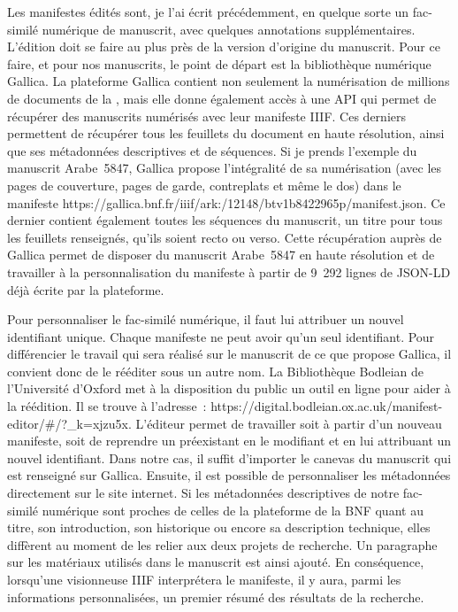 Les manifestes édités sont, je l’ai écrit précédemment, en quelque sorte un fac-similé numérique de manuscrit, avec quelques annotations supplémentaires. L’édition doit se faire au plus près de la version d’origine du manuscrit. Pour ce faire, et pour nos manuscrits, le point de départ est la bibliothèque numérique Gallica. La plateforme Gallica contient non seulement la numérisation de millions de documents de la , mais elle donne également accès à une API qui permet de récupérer des manuscrits numérisés avec leur manifeste IIIF. Ces derniers permettent de récupérer tous les feuillets du document en haute résolution, ainsi que ses métadonnées descriptives et de séquences. Si je prends l’exemple du manuscrit Arabe~5847, Gallica propose l’intégralité de sa numérisation (avec les pages de couverture, pages de garde, contreplats et même le dos) dans le manifeste https://gallica.bnf.fr/iiif/ark:/12148/btv1b8422965p/manifest.json. Ce dernier contient également toutes les séquences du manuscrit, un titre pour tous les feuillets renseignés, qu’ils soient recto ou verso. Cette récupération auprès de Gallica permet de disposer du manuscrit Arabe~5847 en haute résolution et de travailler à la personnalisation du manifeste à partir de 9~292 lignes de JSON-LD déjà écrite par la plateforme.\par
Pour personnaliser le fac-similé numérique, il faut lui attribuer un nouvel identifiant unique. Chaque manifeste ne peut avoir qu’un seul identifiant. Pour différencier le travail qui sera réalisé sur le manuscrit de ce que propose Gallica, il convient donc de le rééditer sous un autre nom. La Bibliothèque Bodleian de l'Université d'Oxford met à la disposition du public un outil en ligne pour aider à la réédition. Il se trouve à l’adresse~: https://digital.bodleian.ox.ac.uk/manifest-editor/\#/?\_k=xjzu5x. L’éditeur permet de travailler soit à partir d’un nouveau manifeste, soit de reprendre un préexistant en le modifiant et en lui attribuant un nouvel identifiant. Dans notre cas, il suffit d’importer le canevas du manuscrit qui est renseigné sur Gallica. Ensuite, il est possible de personnaliser les métadonnées directement sur le site internet. Si les métadonnées descriptives de notre fac-similé numérique sont proches de celles de la plateforme de la BNF quant au titre, son introduction, son historique ou encore sa description technique, elles diffèrent au moment de les relier aux deux projets de recherche. Un paragraphe sur les matériaux utilisés dans le manuscrit est ainsi ajouté. En conséquence, lorsqu’une visionneuse IIIF interprétera le manifeste, il y aura, parmi les informations personnalisées, un premier résumé des résultats de la recherche.\newpage
